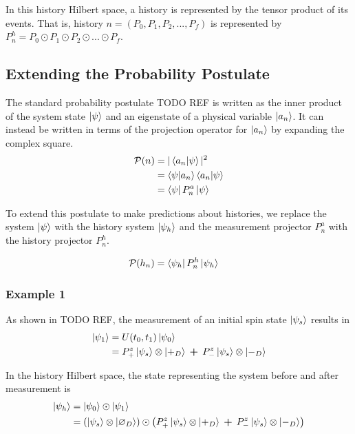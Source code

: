 In this history Hilbert space, a history is represented by the tensor product of its events. That is, history $n = \left( P_0, P_1, P_2, ... , P_f \right)$ is represented by $P^h_n = P_0 \odot P_1 \odot P_2 \odot ... \odot P_f $.

\subsection{Extending the Probability Postulate}
The standard probability postulate TODO REF is written as the inner product of the system state $\ket{\psi}$ and an eigenstate of a physical variable $\ket{a_n}$. It can instead be written in terms of the projection operator for $\ket{a_n}$ by expanding the complex square.
\begin{align}
        \mathcal{P}(n) &= |\braket{a_n|\psi}|^2 \\ \nonumber
        &= \braket{\psi|a_n} \braket{a_n|\psi} \\ \nonumber
        &= \bra{\psi} P^a_n \ket{\psi}
\end{align}

To extend this postulate to make predictions about histories, we replace the system $\ket{\psi}$ with the history system $\ket{\psi_h}$ and the measurement projector $P^a_n$ with the history projector $P^h_n$.

\begin{align}
    \mathcal{P}(h_n) &= \bra{\psi_h} P^h_n \ket{\psi_h}
\end{align}

\subsubsection{Example 1}

As shown in TODO REF, the measurement of an initial spin state $\ket{\psi_s}$ results in
\begin{align}
  \ket{{\psi}_1} &= U(t_0, t_1)\ket{{\psi}_0} \\ \nonumber
  &= P^z_+ \ket{\psi_s} \otimes \ket{+_D} \: \bm{+} \: P^z_- \ket{\psi_s} \otimes \ket{-_D}
\end{align}

In the history Hilbert space, the state representing the system before and after measurement is
\begin{align}
  \ket{\psi_h} &= \ket{\psi_0} \odot \ket{\psi_1} \\ \nonumber
  &= \left(\ket{\psi_s} \otimes \ket{\varnothing_D}\right) \odot \left(P^z_+ \ket{\psi_s} \otimes \ket{+_D} \: \bm{+} \: P^z_- \ket{\psi_s} \otimes \ket{-_D}\right)
\end{align}

